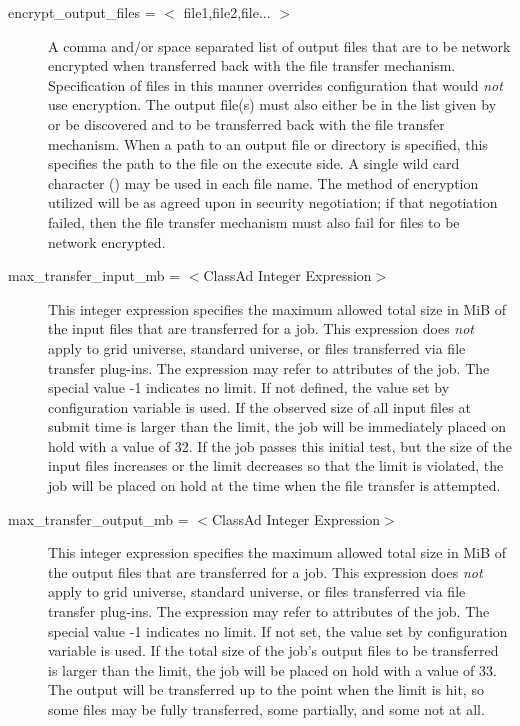 \begin{description}
\label{man-condor-submit-encrypt-output-files}
\item[encrypt\_output\_files = $<$ file1,file2,file... $>$] 
A comma and/or space separated list of output files that are to be
network encrypted when transferred back with the file transfer mechanism.
Specification of files in this manner overrides configuration that would
\emph{not} use encryption.
The output file(s) must also either be in the list given by
 or be discovered and to be transferred
back with the file transfer mechanism.
When a path to an output file or directory is specified, 
this specifies the path to the file on the execute side.
A single wild card character (\Expr{*}) may be used in each file name.
The method of encryption utilized will be as agreed upon in security
negotiation; if that negotiation failed, then the file transfer
mechanism must also fail for files to be network encrypted.


\label{man-condor-submit-max-transfer-input-mb}
\item[max\_transfer\_input\_mb = $<$ClassAd Integer Expression$>$] 
This integer expression specifies the maximum allowed total size in
MiB of the input files that are transferred for a job.  This
expression does \emph{not} apply to grid universe, standard universe, or
files transferred via file transfer plug-ins.  The expression may refer
to attributes of the job.  The special value -1 indicates no limit.
If not defined, the value set by configuration variable
 is used.  
If the observed size of all input files at submit time is
larger than the limit, the job will be immediately placed on hold with
a  value of 32.
If the job passes this initial test, but the size of
the input files increases or the limit decreases so that the limit is
violated, the job will be placed on hold at the time when the file
transfer is attempted.

\label{man-condor-submit-max-transfer-output-mb}
\item[max\_transfer\_output\_mb = $<$ClassAd Integer Expression$>$] 
This integer expression specifies the maximum allowed total size in
MiB of the output files that are transferred for a job.  This
expression does \emph{not} apply to grid universe, standard universe, or
files transferred via file transfer plug-ins.  The expression may refer
to attributes of the job.  The special value -1 indicates no limit.
If not set, the value set by configuration variable
 is used.  
If the total size of the job's output files to be transferred
is larger than the limit, the job will be placed on hold with
a  value of 33.
The output will be transferred up to the point when the
limit is hit, so some files may be fully transferred, some partially,
and some not at all.


\end{description}
